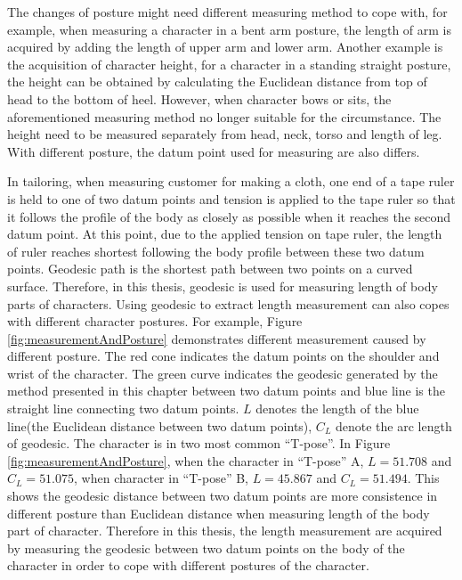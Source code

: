 The changes of posture might need different measuring method to cope with, for example, when measuring a character in a bent arm posture, the length of arm is acquired by adding the length of upper arm and lower arm. Another example is the acquisition of character height, for a character in a standing straight posture, the height can be obtained by calculating the Euclidean distance from top of head to the bottom of heel. However, when character bows or sits, the aforementioned measuring method no longer suitable for the circumstance. The height need to be measured separately from head, neck, torso and length of leg. With different posture, the datum point used for measuring are also differs. 

In tailoring, when measuring customer for making a cloth, one end of a tape ruler is held to one of two datum points and tension is applied to the tape ruler so that it follows the profile of the body as closely as possible when it reaches the second datum point. At this point, due to the applied tension on tape ruler, the length of ruler reaches shortest following the body profile between these two datum points. Geodesic path is the shortest path between two points on a curved surface. Therefore, in this thesis, geodesic is used for measuring length of body parts of characters. Using geodesic to extract length measurement can also copes with different character postures. For example, Figure \ref{fig:measurementAndPosture} demonstrates different measurement caused by different posture. The red cone indicates the datum points on the shoulder and wrist of the character. The green curve indicates the geodesic generated by the method presented in this chapter between two datum points and blue line is the straight line connecting two datum points. $L$ denotes the length of the blue line(the Euclidean distance between two datum points), $C_{L}$ denote the arc length of geodesic. The character is in two most common ``T-pose''. In Figure \ref{fig:measurementAndPosture}, when the character in ``T-pose'' A, $L = 51.708$ and $C_{L} = 51.075$, when character in ``T-pose'' B, $L = 45.867$ and $C_{L} = 51.494$. This shows the geodesic distance between two datum points are more consistence in different posture than Euclidean distance when measuring length of the body part of character. Therefore in this thesis, the length measurement are acquired by measuring the geodesic between two datum points on the body of the character in order to cope with different postures of the character.



